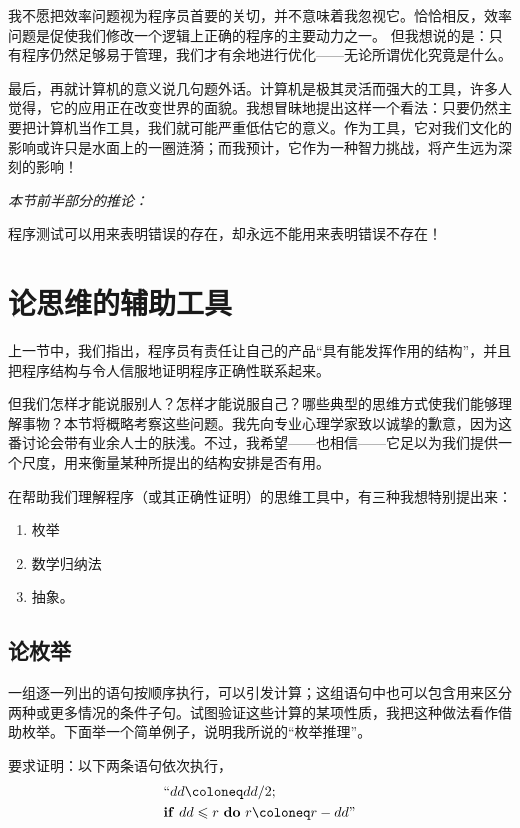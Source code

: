 \documentclass[twoside,11pt,fontset=none]{ctexbook}
\begin{document}
我不愿把效率问题视为程序员首要的关切，并不意味着我忽视它。恰恰相反，效率问题是促使我们修改一个逻辑上正确的程序的主要动力之一。
但我想说的是：只有程序仍然足够易于管理，我们才有余地进行优化——无论所谓优化究竟是什么。

最后，再就计算机的意义说几句题外话。计算机是极其灵活而强大的工具，许多人觉得，它的应用正在改变世界的面貌。我想冒昧地提出这样一个看法：只要仍然主要把计算机当作工具，我们就可能严重低估它的意义。作为工具，它对我们文化的影响或许只是水面上的一圈涟漪；而我预计，它作为一种智力挑战，将产生远为深刻的影响！
\smallskip

\noindent
\textit{本节前半部分的推论：}
\nopagebreak

程序测试可以用来表明错误的存在，却永远不能用来表明错误不存在！

\section[论思维的辅助工具]{论思维的辅助工具}
\label{sec:out-mental-aids}

上一节中，我们指出，程序员有责任让自己的产品“具有能发挥作用的结构”，并且把程序结构与令人信服地证明程序正确性联系起来。

但我们怎样才能说服别人？怎样才能说服自己？哪些典型的思维方式使我们能够理解事物？本节将概略考察这些问题。我先向专业心理学家致以诚挚的歉意，因为这番讨论会带有业余人士的肤浅。不过，我希望——也相信——它足以为我们提供一个尺度，用来衡量某种所提出的结构安排是否有用。

在帮助我们理解程序（或其正确性证明）的思维工具中，有三种我想特别提出来：

\begin{enumerate}[wide, nosep, label=(\arabic*)]
\item 枚举
\item 数学归纳法
\item 抽象。
\end{enumerate}


\subsection{论枚举}
\label{subsec:enumeration}

一组逐一列出的语句按顺序执行，可以引发计算；这组语句中也可以包含用来区分两种或更多情况的条件子句。试图验证这些计算的某项性质，我把这种做法看作借助枚举。下面举一个简单例子，说明我所说的“枚举推理”。

要求证明：以下两条语句依次执行，
\begin{equation*}
	\begin{split}
		&\text{``}dd \coloneq dd/2; \\
		&\text{\textbf{if} } dd \leqslant r \text{ \textbf{do} } r \coloneq r - dd\text{''}
	\end{split}
\end{equation*}
\end{document}
